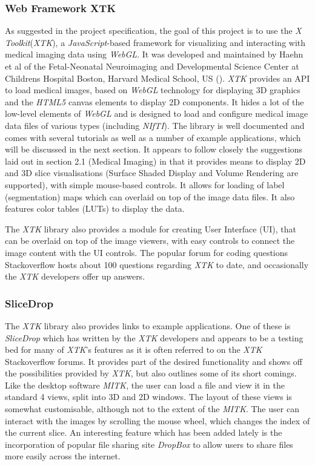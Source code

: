 \documentclass[a4paper,11pt,titlepage]{article}
\begin{document}
\subsubsection{Web Framework XTK}

As suggested in the project specification, the goal of this project is to use the \textit{X Toolkit}(\textit{XTK}), a \textit{JavaScript}-based framework for visualizing and interacting with medical imaging data using \textit{WebGL}. It was developed and maintained by Haehn et al of the Fetal-Neonatal Neuroimaging and Developmental Science Center at Childrens Hospital Boston, Harvard Medical School, US (\cite{xtk}). \textit{XTK} provides an API to load medical images, based on \textit{WebGL} technology for displaying 3D graphics and the \textit{HTML5} canvas elements to display 2D components. It hides a lot of the low-level elements of \textit{WebGL} and is designed to load and configure medical image data files of various types (including \textit{NIfTI}). The library is well documented and comes with several tutorials as well as a number of example applications, which will be discussed in the next section. It appears to follow closely the suggestions laid out in section 2.1 (Medical Imaging) in that it provides means to display 2D and 3D slice visualisations (Surface Shaded Display and Volume Rendering are supported), with simple mouse-based controls. It allows for loading of label (segmentation) maps which can overlaid on top of the image data files. It also features color tables (LUTs) to display the data.

The \textit{XTK} library also provides a module for creating User Interface (UI), that can be overlaid on top of the image viewers, with easy controls to connect the image content with the UI controls.
The popular forum for coding questions Stackoverflow hosts about 100 questions regarding \textit{XTK} to date, and occasionally the \textit{XTK} developers offer up answers.




\subsubsection{SliceDrop}
The \textit{XTK} library also provides links to example applications. One of these is \textit{SliceDrop}\cite{slicedrop} which has written by the \textit{XTK} developers and appears to be a testing bed for many of \textit{XTK}'s features as it is often referred to on the \textit{XTK} Stackoverflow forums. It provides part of the desired functionality and shows off the possibilities provided by \textit{XTK}, but also outlines some of its short comings. Like the desktop software \textit{MITK}, the user can load a file and view it in the standard 4 views, split into 3D and 2D windows. The layout of these views is somewhat customisable, although not to the extent of the \textit{MITK}. The user can interact with the images by scrolling the mouse wheel, which changes the index of the current slice. An interesting feature which has been added lately is the incorporation of popular file sharing site \textit{DropBox} to allow users to share files more easily across the internet.
\end{document}
